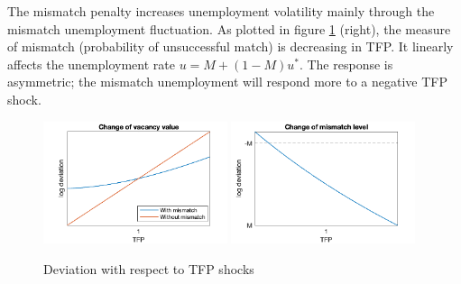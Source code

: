 \documentclass[12pt]{article}
\newcommand{\1}{\mathbb{1}}
\begin{document}
The mismatch penalty increases unemployment volatility mainly through the mismatch unemployment fluctuation. As plotted in figure \ref{Analytical3} (right), the measure of mismatch (probability of unsuccessful match) is decreasing in TFP. It linearly affects the unemployment rate $u = M + (1-M)u^*$. The response is asymmetric; the mismatch unemployment will respond more to a negative TFP shock.  \\

\begin{figure}[h!]
\centering
\includegraphics[width=0.48\textwidth]{Analytical3}
\includegraphics[width=0.48\textwidth]{Analytical4}
\caption{Deviation with respect to TFP shocks}
\label{Analytical3}
\end{figure}
\end{document}
